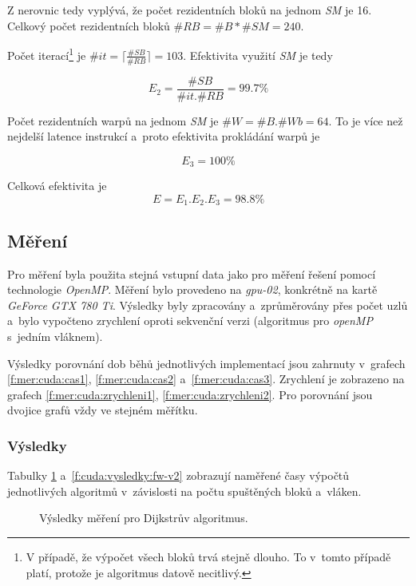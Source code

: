 Z nerovnic tedy vyplývá, že počet rezidentních bloků na jednom \emph{SM} je 16. Celkový počet rezidentních bloků $ \#RB = \#B * \#SM = 240 $.

Počet iterací\footnote{V případě, že výpočet všech bloků trvá stejně dlouho. To v~tomto případě platí, protože je algoritmus datově necitlivý.}
je $ \#it = \lceil \frac{\#SB}{\#RB} \rceil = 103 $. Efektivita využití \emph{SM} je tedy 

$$ E_2 = \frac{\#SB}{\#it . \#RB } = 99.7 \% $$

Počet rezidentních warpů na jednom \emph{SM} je  $ \#W = \#B . \#Wb = 64 $. To je více než nejdelší latence instrukcí a~proto efektivita prokládání 
warpů je 

$$ E_3 = 100 \% $$


Celková efektivita je 
$$ E = E_1 . E_2 . E_3  = 98.8 \% $$

\subsection{Měření} \label{l:cuda:mereni}
Pro měření byla použita stejná vstupní data jako pro měření řešení pomocí technologie \emph{OpenMP}. Měření bylo provedeno na \emph{gpu-02}, konkrétně na kartě \emph{GeForce GTX 780 Ti}. Výsledky byly zpracovány a~zprůměrovány přes počet uzlů a~bylo vypočteno zrychlení oproti sekvenční verzi (algoritmus pro \emph{openMP} s~jedním vláknem).

Výsledky porovnání dob běhů jednotlivých implementací jsou zahrnuty v~grafech \ref{f:mer:cuda:cas1}, \ref{f:mer:cuda:cas2} a~\ref{f:mer:cuda:cas3}. Zrychlení je zobrazeno na grafech \ref{f:mer:cuda:zrychleni1}, \ref{f:mer:cuda:zrychleni2}. Pro porovnání jsou dvojice grafů vždy ve stejném měřítku.

\subsubsection{Výsledky} \label{f:cuda:vysledky}
Tabulky \ref{f:cuda:vysledky:dijkstra} a~\ref{f:cuda:vysledky:fw-v2} zobrazují naměřené časy výpočtů jednotlivých algoritmů v~závislosti na počtu spuštěných bloků a~vláken.

\begin{figure}
    \centering
    \caption{Výsledky měření pro Dijkstrův algoritmus.}
    \label{f:cuda:vysledky:dijkstra}
\end{figure}

